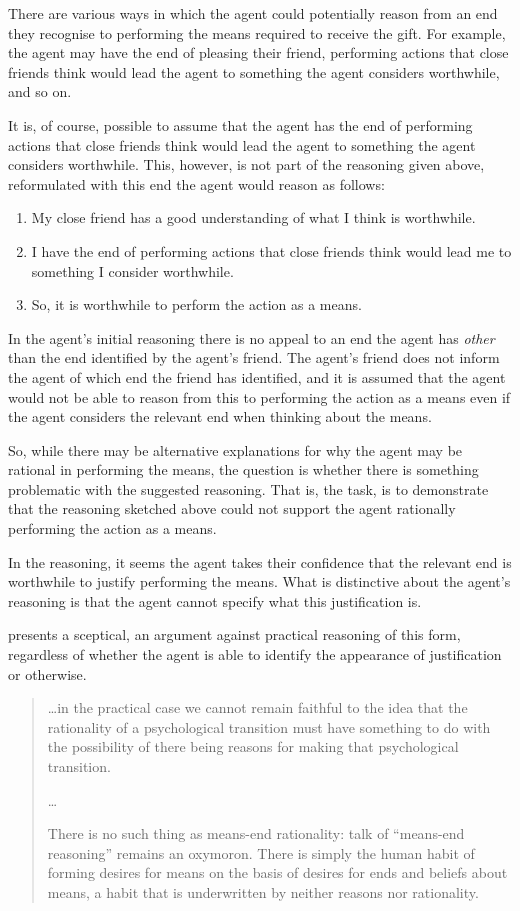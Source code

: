 \documentclass[10pt]{article}
\begin{document}
There are various ways in which the agent could potentially reason from an end they recognise to performing the means required to receive the gift.
For example, the agent may have the end of pleasing their friend, performing actions that close friends think would lead the agent to something the agent considers worthwhile, and so on.

It is, of course, possible to assume that the agent has the end of performing actions that close friends think would lead the agent to something the agent considers worthwhile.
This, however, is not part of the reasoning given above, reformulated with this end the agent would reason as follows:

\begin{enumerate}
\item My close friend has a good understanding of what I think is worthwhile.
\item I have the end of performing actions that close friends think would lead me to something I consider worthwhile.
\item So, it is worthwhile to perform the action as a means.
\end{enumerate}

In the agent's initial reasoning there is no appeal to an end the agent has \emph{other} than the end identified by the agent's friend.
The agent's friend does not inform the agent of which end the friend has identified, and it is assumed that the agent would not be able to reason from this to performing the action as a means even if the agent considers the relevant end when thinking about the means.

So, while there may be alternative explanations for why the agent may be rational in performing the means, the question is whether there is something problematic with the suggested reasoning.
That is, the task, is to demonstrate that the reasoning sketched above could not support the agent rationally performing the action as a means.

In the reasoning, it seems the agent takes their confidence that the relevant end is worthwhile to justify performing the means.
What is distinctive about the agent's reasoning is that the agent cannot specify what this justification is.

\citeauthor{Smith:2004aa} presents a sceptical, \citeauthor{Hume:2011aa}an argument against practical reasoning of this form, regardless of whether the agent is able to identify the appearance of justification or otherwise.
\begin{quote}
  \dots in the practical case we cannot remain faithful to the idea that the rationality of a psychological transition must have something to do with the possibility of there being reasons for making that psychological transition.

  \dots

  There is no such thing as means-end rationality: talk of ``means-end reasoning'' remains an oxymoron.
  There is simply the human habit of forming desires for means on the basis of desires for ends and beliefs about means, a habit that is underwritten by neither reasons nor rationality.\nolinebreak
  \mbox{}\hfill\mbox{\citeyear[88]{Smith:2004aa}}
\end{quote}
\end{document}
